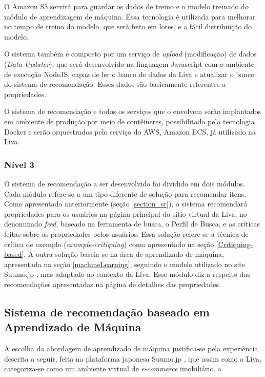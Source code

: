 O Amazon S3 servirá para guardar os dados de treino e o modelo treinado do módulo de aprendizagem de máquina. Essa tecnologia é utilizada para melhorar no tempo de treino do modelo, que será feito em lotes, e a fácil distribuição do modelo.

O sistema também é composto por um serviço de \textit{upload} (modificação) de dados (\textit{Data Updater}), que será desenvolvido na linguagem Javascript com o ambiente de execução NodeJS, capaz de ler o banco de dados da Liva e atualizar o banco do sistema de recomendação. Esses dados são basicamente referentes a propriedades.

O sistema de recomendação e todos os serviços que o envolvem serão implantados em ambiente de produção por meio de contêineres, possibilitado pela tecnologia Docker e serão orquestrados pelo serviço do AWS, Amazon ECS, já utilizado na Liva.
	
\subsubsection{Nível 3}
\label{nivel3}

O sistema de recomendação a ser desenvolvido foi dividido em dois módulos. Cada módulo refere-se a um tipo diferente de solução para recomendar itens. Como apresentado anteriormente (seção \ref{section_sr}), o sistema recomendará propriedades para os usuários na página principal do sítio virtual da Liva, no denominado \textit{feed}, baseado na ferramenta de busca, o Perfil de Busca, e as críticas feitas sobre as propriedades pelos usuários. Essa solução refere-se a técnica de crítica de exemplo (\textit{example-critiquing}) como apresentado na seção \ref{Critiquing-based}. A outra solução baseia-se na área de aprendizado de máquina, apresentada na seção \ref{machineLearning}, seguindo o modelo utilizado no site Suumo.jp \cite{Summo:2017}, mas adaptado ao contexto da Liva. Esse módulo diz a respeito das recomendações apresentadas na página de detalhes das propriedades.

\subsection{Sistema de recomendação baseado em Aprendizado de Máquina}
\label{sr_ml}

A escolha da abordagem de aprendizado de máquina justifica-se pela experiência descrita a seguir, feita na plataforma japonesa Suumo.jp \cite{Summo:2017}, que assim como a Liva, categoriza-se como um ambiente virtual de \textit{e-commerce} imobiliário.
a

